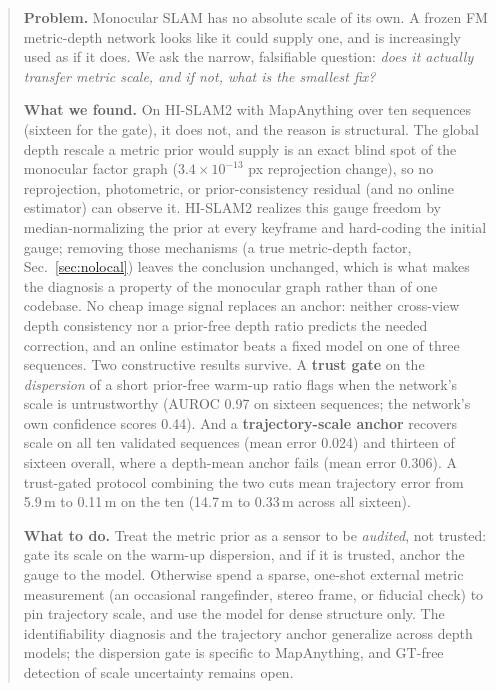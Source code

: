 \begin{abstract}
\textbf{Problem.} Monocular SLAM has no absolute scale of its own. A frozen FM
metric-depth network looks like it could supply one, and is increasingly used as
if it does. We ask the narrow, falsifiable question: \emph{does it actually
transfer metric scale, and if not, what is the smallest fix?}

\textbf{What we found.} On HI-SLAM2 with MapAnything over ten sequences (sixteen
for the gate), it does not, and the reason is structural. The global depth
rescale a metric prior would supply is an exact blind spot of the monocular
factor graph ($3.4\times10^{-13}$ px reprojection change), so no reprojection,
photometric, or prior-consistency residual (and no online estimator) can
observe it. HI-SLAM2 realizes this gauge freedom by median-normalizing the prior
at every keyframe and hard-coding the initial gauge; removing those mechanisms
(a true metric-depth factor, Sec.~\ref{sec:nolocal}) leaves the conclusion unchanged, which is
what makes the diagnosis a property of the monocular graph rather than of one
codebase. No
cheap image signal replaces an anchor: neither cross-view depth consistency nor a
prior-free depth ratio predicts the needed correction, and an online estimator
beats a fixed model on one of three sequences. Two constructive results survive.
A \textbf{trust gate} on the \emph{dispersion} of a short prior-free warm-up ratio
flags when the network's scale is untrustworthy (AUROC 0.97 on sixteen sequences;
the network's own confidence scores 0.44). And a \textbf{trajectory-scale anchor}
recovers scale on all ten validated sequences (mean error 0.024) and thirteen of
sixteen overall, where a depth-mean anchor
fails (mean error 0.306). A trust-gated protocol combining the two cuts mean
trajectory error from 5.9\,m to 0.11\,m on the ten (14.7\,m to 0.33\,m across all
sixteen).

\textbf{What to do.} Treat the metric prior as a sensor to be \emph{audited}, not
trusted: gate its scale on the warm-up dispersion, and if it is trusted, anchor
the gauge to the model. Otherwise spend a sparse, one-shot external metric
measurement (an occasional rangefinder, stereo frame, or fiducial check) to
pin trajectory scale, and use the model for dense structure only. The
identifiability diagnosis and the trajectory anchor generalize across depth
models; the dispersion gate is specific to MapAnything, and GT-free detection of
scale uncertainty remains open.
\end{abstract}

